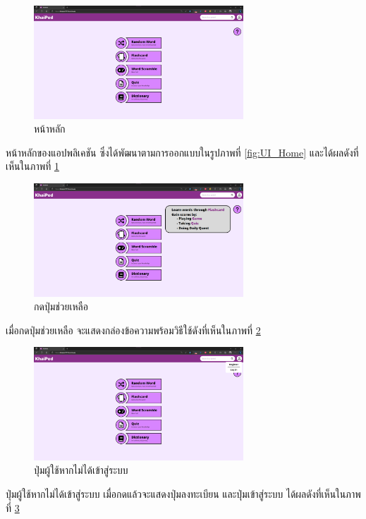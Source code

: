 \documentclass[12pt,oneside,openright,a4paper]{cpe-thai-project}
\begin{document}
\begin{figure}[!h]\centering
	\includegraphics[width=0.7\textwidth, keepaspectratio=true]{image/chap4/UI/home/home.png}
	\caption{{หน้าหลัก}}\label{fig:chap4UIHome}
\end{figure}
\hspace{1cm}
หน้าหลักของแอปพลิเคชัน ซึ่งได้พัฒนาตามการออกแบบในรูปภาพที่ \ref{fig:UI_Home} และได้ผลดังที่เห็นในภาพที่ \ref{fig:chap4UIHome}

\begin{figure}[!h]\centering
	\includegraphics[width=0.7\textwidth, keepaspectratio=true]{image/chap4/UI/home/home help.png}
	\caption{{กดปุ่มช่วยเหลือ}}\label{fig:chap4UIHomeHelp}
\end{figure}
\hspace{1cm}
เมื่อกดปุ่มช่วยเหลือ จะแสดงกล่องข้อความพร้อมวิธีใช้ดังที่เห็นในภาพที่ \ref{fig:chap4UIHomeHelp}

\pagebreak
\begin{figure}[!h]\centering
	\includegraphics[width=0.7\textwidth, keepaspectratio=true]{image/chap4/UI/home/guest button.png}
	\caption{{ปุ่มผู้ใช้หากไม่ได้เข้าสู่ระบบ}}\label{fig:chap4UIGuestButton}
\end{figure}
\hspace{1cm}
ปุ่มผู้ใช้หากไม่ได้เข้าสู่ระบบ เมื่อกดแล้วจะแสดงปุ่มลงทะเบียน และปุ่มเข้าสู่ระบบ ได้ผลดังที่เห็นในภาพที่ \ref{fig:chap4UIGuestButton}
\end{document}
